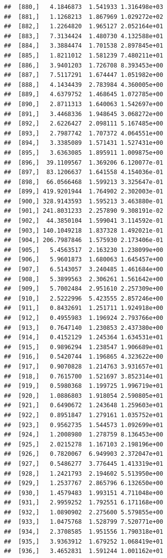 \documentclass[article]{jss}\usepackage[]{graphicx}\usepackage[]{xcolor}
\makeatletter
\newenvironment{kframe}{%
 \def\at@end@of@kframe{}%
 \ifinner\ifhmode%
  \def\at@end@of@kframe{\end{minipage}}%
  \begin{minipage}{\columnwidth}%
 \fi\fi%
 \def\FrameCommand##1{\hskip\@totalleftmargin \hskip-\fboxsep
 \colorbox{shadecolor}{##1}\hskip-\fboxsep
     \hskip-\linewidth \hskip-\@totalleftmargin \hskip\columnwidth}%
 \MakeFramed {\advance\hsize-\width
   \@totalleftmargin\z@ \linewidth\hsize
   \@setminipage}}%
 {\par\unskip\endMakeFramed%
 \at@end@of@kframe}
\newenvironment{knitrout}{}{} %
\makeatother
\begin{document}
\begin{knitrout}
\begin{kframe}
\begin{verbatim}
##  [880,]   4.1846873  1.541933 1.316498e+03
##  [881,]   1.1268213  1.867969 1.029272e+02
##  [882,]   1.2264820  1.965127 2.052164e+01
##  [883,]   7.3134424  1.480730 4.132588e+01
##  [884,]   3.3884474  1.701538 2.897845e+01
##  [885,]   1.8211012  1.581239 7.480211e+01
##  [886,]   3.9401203  1.726708 8.393453e+00
##  [887,]   7.5117291  1.674447 1.051982e+00
##  [888,]   4.1434439  2.783984 4.360005e+00
##  [889,]   4.6379752  1.468645 1.072785e+00
##  [890,]   2.8711313  1.640063 1.542697e+00
##  [891,]   3.4468336  1.948645 3.068272e+00
##  [892,]   2.6226427  2.098111 5.167485e+00
##  [893,]   2.7987742  1.707372 4.064551e+00
##  [894,]   3.3385089  1.571431 1.527431e+00
##  [895,]   3.6363085  1.895911 1.009875e+00
##  [896,]  39.1109567  1.369206 6.120077e-01
##  [897,]  83.1206637  1.641558 4.154036e-01
##  [898,]  66.0566468  1.599213 3.325647e-01
##  [899,] 419.9201944  1.764902 2.302003e-01
##  [900,] 328.9143593  1.595213 3.463880e-01
##  [901,] 241.8031233  2.257890 9.308191e-02
##  [902,]  44.3850104  1.599041 3.114592e-01
##  [903,] 140.1049218  1.837328 1.492021e-01
##  [904,] 206.7987846  1.575930 2.173406e-01
##  [905,]   5.4563517  2.163230 1.238099e+00
##  [906,]   5.9601873  1.680063 1.645457e+00
##  [907,]   6.5143057  3.240485 1.461684e+00
##  [908,]   5.3899563  2.306261 1.561642e+00
##  [909,]   5.7002484  2.951610 2.257309e+00
##  [910,]   2.5222996  5.423555 2.857246e+00
##  [911,]   0.8432691  1.251711 1.924918e+00
##  [912,]   0.4955983  1.196924 2.793766e+00
##  [913,]   0.7647140  1.230853 2.437380e+00
##  [914,]   0.4152129  1.245364 1.634531e+01
##  [915,]   0.9896294  1.238547 1.906689e+01
##  [916,]   0.5420744  1.196865 4.323622e+00
##  [917,]   0.9070828  1.214763 3.931657e+01
##  [918,]   0.7615700  1.521697 3.852314e+01
##  [919,]   0.5980368  1.199725 1.996719e+01
##  [920,]   1.0886803  1.918054 2.590805e+01
##  [921,]   0.6490672  1.243648 1.259603e+01
##  [922,]   0.8951847  1.279161 1.035752e+01
##  [923,]   0.9562735  1.544573 1.092699e+01
##  [924,]   1.2008980  1.278759 8.136453e+00
##  [925,]   2.0215278  1.167103 2.198196e+00
##  [926,]   0.7820067  6.949903 2.372047e+01
##  [927,]   0.5486277  3.776445 1.413319e+01
##  [928,]   1.2421793  2.194602 5.513950e+00
##  [929,]   1.2537767  2.865796 6.132650e+00
##  [930,]   1.4579483  1.993151 4.711048e+00
##  [931,]   2.9959252  1.792551 6.171168e+00
##  [932,]   1.0890902  2.275600 5.579855e+00
##  [933,]   1.0475768  1.528799 7.520771e+00
##  [934,]   2.3708585  1.951556 1.790318e+01
##  [935,]   3.9363912  1.679252 1.068419e+01
##  [936,]   3.4652831  1.591244 1.001162e+01

\end{verbatim}
\end{kframe}
\end{knitrout}
\end{document}
